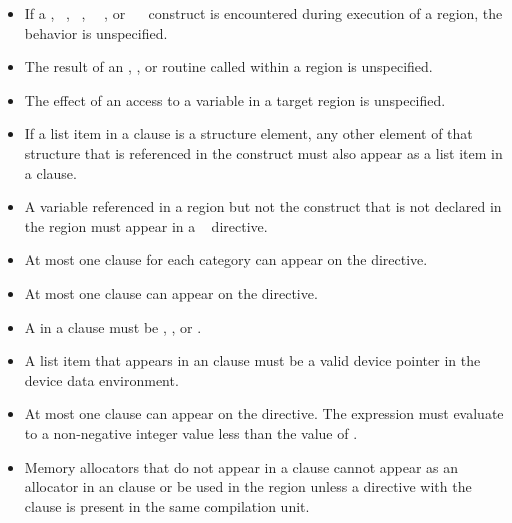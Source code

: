 \restrictions
\begin{itemize}
\item If a , ~,
~, ~~, or
~~ construct is encountered during
execution of a  region, the behavior is unspecified.

\item The result of an ,
, or 
routine called within a  region is unspecified.

\item The effect of an access to a  variable in a target region is
unspecified.

\item If a list item in a  clause is a structure element, any other
element of that structure that is referenced in the  construct
must also appear as a list item in a  clause.

\item A variable referenced in a  region but not the  construct that is not
declared in the  region must appear in a ~ directive.

\item At most one  clause for each category can appear on the directive.

\item At most one  clause can appear on the directive.

\item A  in a  clause must be , ,  or .

\item A list item that appears in an  clause must be a valid device pointer in the device data environment.

\item At most one  clause can appear on the
  directive.  The  expression must evaluate to a
  non-negative integer value less than the value of
  .

\item Memory allocators that do not appear in a  clause cannot appear as an allocator in an  clause or be used in the  region unless a  directive with the  clause is present in the same compilation unit.


\end{itemize}
